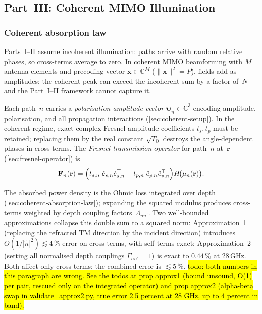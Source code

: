 \documentclass[11pt,a4paper]{article}
\theoremstyle{definition}      %
\newcommand{\rr}{\mathbf{r}}
\newcommand{\ntilde}{\tilde{n}}
\begin{document}
\subsection{Part~III: Coherent MIMO Illumination}
\label{sum:part3}

\subsubsection*{Coherent absorption law}

Parts~I--II assume incoherent illumination: paths arrive with random
relative phases, so cross-terms average to zero.
In coherent MIMO beamforming with $M$ antenna elements and precoding
vector $\mathbf{x}\in\mathbb{C}^M$ ($\|\mathbf{x}\|^2=P$), fields add
as amplitudes; the coherent peak can exceed the incoherent sum by a
factor of~$N$ and the Part~I--II framework cannot capture it.

Each path~$n$ carries a \emph{polarisation-amplitude vector}
$\boldsymbol{\psi}_n\in\mathbb{C}^3$ encoding amplitude, polarisation,
and all propagation interactions (\cref{sec:coherent-setup}).
In the coherent regime, exact complex Fresnel amplitude coefficients
$t_s, t_p$ must be retained; replacing them by the real constant
$\sqrt{T_0}$ destroys the angle-dependent phases in cross-terms.
The \emph{Fresnel transmission operator} for path~$n$ at~$\rr$
(\cref{sec:fresnel-operator}) is
\begin{equation}\label{sum:eq:Fn}
  \mathbf{F}_n(\rr) =
  \Bigl(
    t_{s,n}\;\hat{e}_{s,n}\hat{e}_{s,n}^\top
    + t_{p,n}\;\hat{e}_{p,n}\hat{e}_{p,n}^\top
  \Bigr)H\!\bigl(\mu_n(\rr)\bigr).
\end{equation}

The absorbed power density is the Ohmic loss integrated over depth
(\cref{sec:coherent-absorption-law}); expanding the squared modulus
produces cross-terms weighted by depth coupling factors~$\Lambda_{nn'}$.
Two well-bounded approximations collapse this double sum to a squared
norm: Approximation~1 (replacing the refracted TM direction by the
incident direction) introduces $O(1/|\ntilde|^2)\lesssim4\,\%$ error on
cross-terms, with self-terms exact; Approximation~2 (setting all
normalised depth couplings $\Gamma_{nn'}=1$) is exact to $0.44\,\%$
at 28\,GHz.  Both affect only cross-terms; the combined error is
$\lesssim5\,\%$.
\hl{todo: both numbers in this paragraph are wrong. See the todos at
prop approx1 (bound unsound, O(1) per pair, rescued only on the
integrated operator) and prop approx2 (alpha-beta swap in
validate\_approx2.py, true error 2.5 percent at 28 GHz, up to 4
percent in band).}
\end{document}
